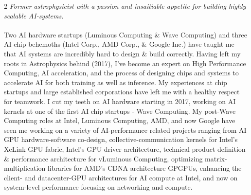 \documentclass[10pt,a4paper]{article}
\begin{document}
\vspace{-1.3em}  %
\begin{multicols}{2}  %
\noindent \emph{Former astrophysicist with a passion and insaitiable appetite for building highly scalable AI-systems.}
\\
\\
Two AI hardware startups (Luminous Computing \& Wave Computing) and three AI chip behemoths (Intel Corp., AMD Corp., \& Google Inc.) have taught me that AI systems are incredibly hard to design \& build correctly. Having left my roots in Astrophysics behind (2017), I've become an expert on High Performance Computing, AI acceleration, and the process of designing chips and systems to accelerate AI for both training as well as inference. My experiences at chip startups and large established corporations have left me with a healthy respect for teamwork. I cut my teeth on AI hardware starting in 2017, working on AI kernels at one of the first AI chip startups - Wave Computing. My post-Wave Computing roles at Intel, Luminous Computing, AMD, and now Google have seen me working on a variety of AI-performance related projects ranging from AI GPU hardware-software co-design, collective-communication kernels for Intel's XeLink GPU-fabric, Intel's GPU driver architecture, technical product definition \& performance architecture for vLuminous Computing, optimizing matrix-multiplication libraries for AMD's CDNA architecture GPGPUs, enhancing the client- and datacenter-GPU architectures for AI compute at Intel, and now on system-level performance focusing on networking and compute. 





\end{multicols}
\end{document}
